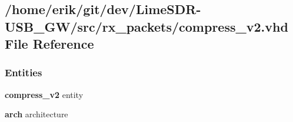 \subsection{/home/erik/git/dev/\+Lime\+S\+D\+R-\/\+U\+S\+B\+\_\+\+G\+W/src/rx\+\_\+packets/compress\+\_\+v2.vhd File Reference}
\label{compress__v2_8vhd}
\subsubsection*{Entities}
\begin{DoxyCompactItemize}
\item 
{\bf compress\+\_\+v2} entity
\item 
{\bf arch} architecture
\end{DoxyCompactItemize}
